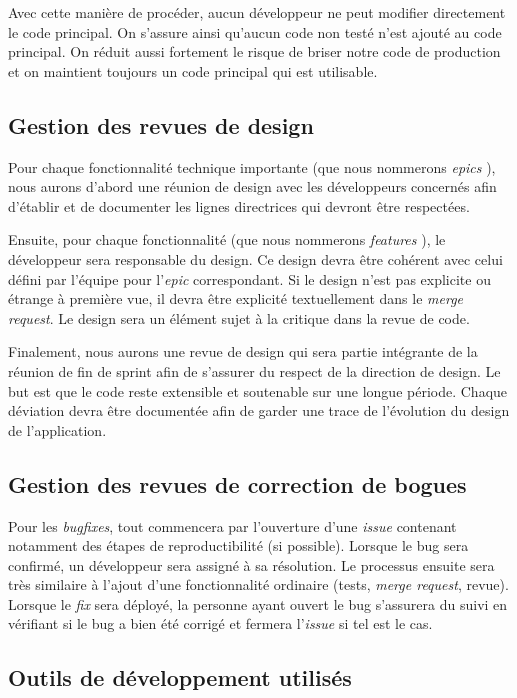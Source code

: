 	Avec cette manière de procéder, aucun développeur ne peut modifier directement le code principal. On s’assure ainsi qu’aucun code non testé n’est ajouté au code principal. On réduit aussi fortement le risque de briser notre code de production et on maintient toujours un code principal qui est utilisable. 
	
	\subsection{Gestion des revues de design}
	Pour chaque fonctionnalité technique importante (que nous nommerons \og \emph{epics} \fg{}), nous aurons d’abord une réunion de design avec les développeurs concernés afin d’établir et de documenter les lignes directrices qui devront être respectées. 

	Ensuite, pour chaque fonctionnalité (que nous nommerons \og \emph{features} \fg{}), le développeur sera responsable du design. Ce design devra être cohérent avec celui défini par l’équipe pour l’\emph{epic} correspondant. Si le design n’est pas explicite ou étrange à première vue, il devra être explicité textuellement dans le \emph{merge request}. Le design sera un élément sujet à la critique dans la revue de code. 

	Finalement, nous aurons une revue de design qui sera partie intégrante de la réunion de fin de sprint afin de s’assurer du respect de la direction de design. Le but est que le code reste extensible et soutenable sur une longue période. Chaque déviation devra être documentée afin de garder une trace de l’évolution du design de l'application. 

	\subsection{Gestion des revues de correction de bogues}
	Pour les \emph{bugfixes}, tout commencera par l’ouverture d’une \emph{issue} contenant notamment des étapes de reproductibilité (si possible). Lorsque le bug sera confirmé, un développeur sera assigné à sa résolution. Le processus ensuite sera très similaire à l’ajout d’une fonctionnalité ordinaire (tests, \emph{merge request}, revue). Lorsque le \emph{fix} sera déployé, la personne ayant ouvert le bug s’assurera du suivi en vérifiant si le bug a bien été corrigé et fermera l’\emph{issue} si tel est le cas.

	\subsection{Outils de développement utilisés}
